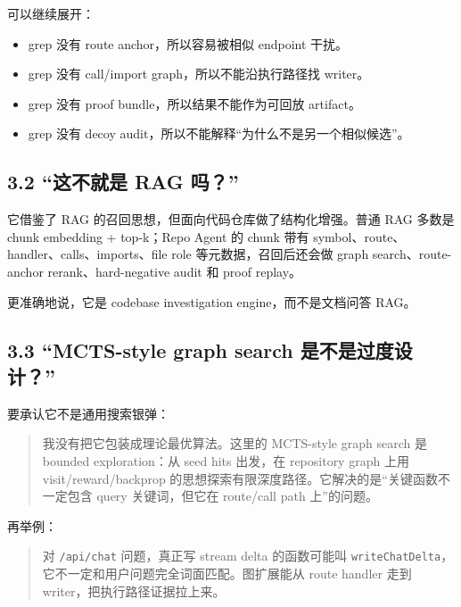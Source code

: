 \documentclass[UTF8,12pt,openany]{ctexbook}
\begin{document}
可以继续展开：\par

\begin{itemize}
\item grep 没有 route anchor，所以容易被相似 endpoint 干扰。
\item grep 没有 call/import graph，所以不能沿执行路径找 writer。
\item grep 没有 proof bundle，所以结果不能作为可回放 artifact。
\item grep 没有 decoy audit，所以不能解释“为什么不是另一个相似候选”。
\end{itemize}

\subsection{3.2 “这不就是 RAG 吗？”}

它借鉴了 RAG 的召回思想，但面向代码仓库做了结构化增强。普通 RAG 多数是 chunk embedding + top-k；Repo Agent 的 chunk 带有 symbol、route、handler、calls、imports、file role 等元数据，召回后还会做 graph search、route-anchor rerank、hard-negative audit 和 proof replay。  \par

更准确地说，它是 codebase investigation engine，而不是文档问答 RAG。\par

\subsection{3.3 “MCTS-style graph search 是不是过度设计？”}

要承认它不是通用搜索银弹：\par

\begin{quote}
我没有把它包装成理论最优算法。这里的 MCTS-style graph search 是 bounded exploration：从 seed hits 出发，在 repository graph 上用 visit/reward/backprop 的思想探索有限深度路径。它解决的是“关键函数不一定包含 query 关键词，但它在 route/call path 上”的问题。
\end{quote}

再举例：\par

\begin{quote}
对 \texttt{/api/chat} 问题，真正写 stream delta 的函数可能叫 \texttt{writeChatDelta}，它不一定和用户问题完全词面匹配。图扩展能从 route handler 走到 writer，把执行路径证据拉上来。
\end{quote}
\end{document}
